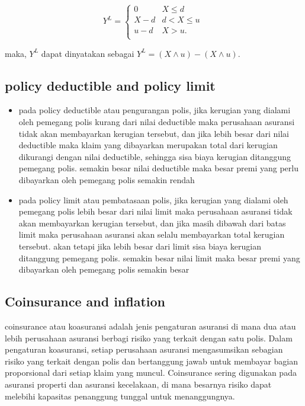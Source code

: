 \documentclass[
]{book}
\begin{document}
\[
Y^{L} = \left\{ \begin{matrix}
0 & X \leq d \\
X - d  & d <  X \leq u \\
 u - d  & X > u. \\
\end{matrix} \right.\
\]

maka, \(Y^L\) dapat dinyatakan sebagai \(Y^L=(X\land u)-(X\land u)\).

\hypertarget{policy-deductible-and-policy-limit}{%
\subsection{policy deductible and policy limit}\label{policy-deductible-and-policy-limit}}

\begin{itemize}
\item
  pada policy deductible atau pengurangan polis, jika kerugian yang dialami oleh pemegang polis kurang dari nilai deductible maka perusahaan asuransi tidak akan membayarkan kerugian tersebut, dan jika lebih besar dari nilai deductible maka klaim yang dibayarkan merupakan total dari kerugian dikurangi dengan nilai deductible, sehingga sisa biaya kerugian ditanggung pemegang polis.
  semakin besar nilai deductible maka besar premi yang perlu dibayarkan oleh pemegang polis semakin rendah
\item
  pada policy limit atau pembatasaan polis, jika kerugian yang dialami oleh pemegang polis lebih besar dari nilai limit maka perusahaan asuransi tidak akan membayarkan kerugian tersebut, dan jika masih dibawah dari batas limit maka perusahaan asuransi akan selalu membayarkan total kerugian tersebut. akan tetapi jika lebih besar dari limit sisa biaya kerugian ditanggung pemegang polis.
  semakin besar nilai limit maka besar premi yang dibayarkan oleh pemegang polis semakin besar
\end{itemize}

\hypertarget{coinsurance-and-inflation}{%
\subsection{Coinsurance and inflation}\label{coinsurance-and-inflation}}

coinsurance atau koasuransi adalah jenis pengaturan asuransi di mana dua atau lebih perusahaan asuransi berbagi risiko yang terkait dengan satu polis. Dalam pengaturan koasuransi, setiap perusahaan asuransi mengasumsikan sebagian risiko yang terkait dengan polis dan bertanggung jawab untuk membayar bagian proporsional dari setiap klaim yang muncul. Coinsurance sering digunakan pada asuransi properti dan asuransi kecelakaan, di mana besarnya risiko dapat melebihi kapasitas penanggung tunggal untuk menanggungnya.
\end{document}
